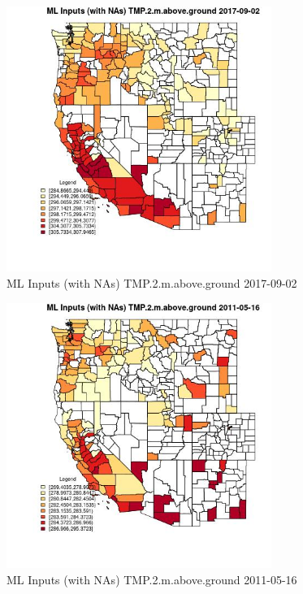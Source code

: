 \begin{figure} 
\centering  
\includegraphics[width=0.77\textwidth]{Code_Outputs/Report_ML_input_PM25_Step4_part_e_de_duplicated_aves_compiled_2019-05-21wNAs_CountyTMP2mabovegroundMean2017-09-02.jpg} 
\caption{\label{fig:Report_ML_input_PM25_Step4_part_e_de_duplicated_aves_compiled_2019-05-21wNAsCountyTMP2mabovegroundMean2017-09-02}ML Inputs (with NAs) TMP.2.m.above.ground 2017-09-02} 
\end{figure} 
 

\begin{figure} 
\centering  
\includegraphics[width=0.77\textwidth]{Code_Outputs/Report_ML_input_PM25_Step4_part_e_de_duplicated_aves_compiled_2019-05-21wNAs_CountyTMP2mabovegroundMean2011-05-16.jpg} 
\caption{\label{fig:Report_ML_input_PM25_Step4_part_e_de_duplicated_aves_compiled_2019-05-21wNAsCountyTMP2mabovegroundMean2011-05-16}ML Inputs (with NAs) TMP.2.m.above.ground 2011-05-16} 
\end{figure} 
 

